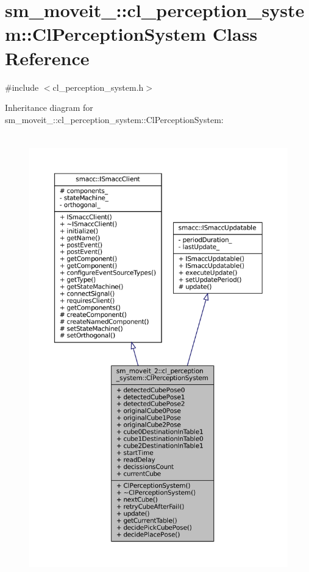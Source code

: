\hypertarget{classsm__moveit__2_1_1cl__perception__system_1_1ClPerceptionSystem}{}\section{sm\+\_\+moveit\+\_\+:\+:cl\+\_\+perception\+\_\+system\+:\+:Cl\+Perception\+System Class Reference}
\label{classsm__moveit__2_1_1cl__perception__system_1_1ClPerceptionSystem}


{\ttfamily \#include $<$cl\+\_\+perception\+\_\+system.\+h$>$}



Inheritance diagram for sm\+\_\+moveit\+\_\+:\+:cl\+\_\+perception\+\_\+system\+:\+:Cl\+Perception\+System\+:
\nopagebreak
\begin{figure}[H]
\begin{center}
\leavevmode
\includegraphics[height=550pt]{classsm__moveit__2_1_1cl__perception__system_1_1ClPerceptionSystem__inherit__graph}
\end{center}
\end{figure}


